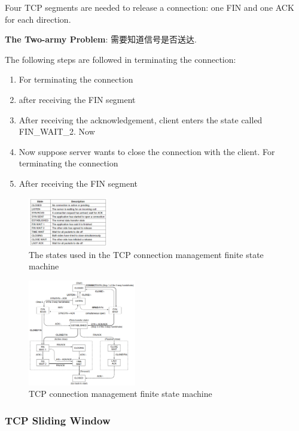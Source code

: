 Four TCP segments are needed to release a connection: one FIN and one ACK for each direction. 

\textbf{The Two-army Problem}: 需要知道信号是否送达. 

The following steps are followed in terminating the connection:
\begin{enumerate}\scriptsize %
    \item For terminating the connection
    \item after receiving the FIN segment
    \item After receiving the acknowledgement, client enters the state called FIN\_WAIT\_2. Now
    \item Now suppose server wants to close the connection with the client. For terminating the connection
    \item After receiving the FIN segment
\end{enumerate}

\begin{figure}[!htb]
    \centering
    \includegraphics[width=0.309\textwidth]{pic/CN6/The states used in the TCP connection management finite state machine}
    \caption{The states used in the TCP connection management finite state machine}
\end{figure}

\begin{figure}[!htb]
    \centering
    \includegraphics[width=0.42\textwidth]{pic/CN6/TCP connection management finite state machine}
    \caption{TCP connection management finite state machine}
\end{figure}


\subsubsection{TCP Sliding Window}

